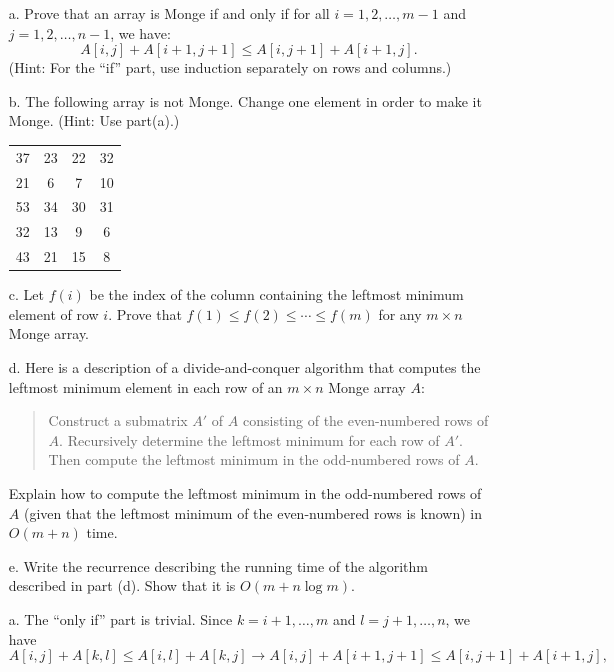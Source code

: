 \documentclass{report}
\makeatletter
\renewenvironment{framed}{%
 \def\FrameCommand##1{\hskip\@totalleftmargin
 \fboxsep=\FrameSep\fbox{##1}}%
 \MakeFramed {\advance\hsize-\width
   \@totalleftmargin\z@ \linewidth\hsize
   \@setminipage}}%
 {\par\unskip\endMakeFramed}
\makeatother
\begin{document}
\begin{enumerate}
{\begin{enumerate}
  \item[a.] Prove that an array is Monge if and only if for all $i = 1, 2,
    \dots, m - 1$ and $j = 1, 2, \dots, n - 1$, we have:
    \[
      A[i, j] + A[i + 1, j + 1] \le A[i, j + 1] + A[i + 1, j].
    \]
    (Hint: For the ``if'' part, use induction separately on rows and columns.)
  \item[b.] The following array is not Monge. Change one element in order to
    make it Monge. (Hint: Use part(a).)

    \begin{tabular}{cccc}
      37 & 23 & 22 & 32\\
      21 & 6  & 7  & 10\\
      53 & 34 & 30 & 31\\
      32 & 13 & 9  & 6\\
      43 & 21 & 15 & 8
    \end{tabular}
  \item[c.] Let $f(i)$ be the index of the column containing the leftmost
    minimum element of row $i$. Prove that $f(1) \le f(2) \le \cdots \le f(m)$
    for any $m \times n$ Monge array.
  \item[d.] Here is a description of a divide-and-conquer algorithm that
    computes the leftmost minimum element in each row of an $m \times n$ Monge array $A$:

    \begin{quote}
      Construct a submatrix $A'$ of $A$ consisting of the even-numbered rows of
      $A$.  Recursively determine the leftmost minimum for each row of $A'$.
      Then compute the leftmost minimum in the odd-numbered rows of $A$.
    \end{quote}

    Explain how to compute the leftmost minimum in the odd-numbered rows of $A$
    (given that the leftmost minimum of the even-numbered rows is known) in
    $O(m + n)$ time.

  \item[e.] Write the recurrence describing the running time of the algorithm
    described in part (d). Show that it is $O(m + n \log m)$.
\end{enumerate}
}

\begin{framed}
  \begin{enumerate}
    \item[a.] The ``only if'' part is trivial. Since $k = i + 1, \dots, m$ and $l = j + 1, \dots, n$, we have
      \[
        A[i, j] + A[k, l] \le A[i, l] + A[k, j] \rightarrow A[i, j] + A[i + 1, j + 1] \le A[i, j + 1] + A[i + 1, j],
      \]


\end{enumerate}
\end{framed}
\end{enumerate}
\end{document}
